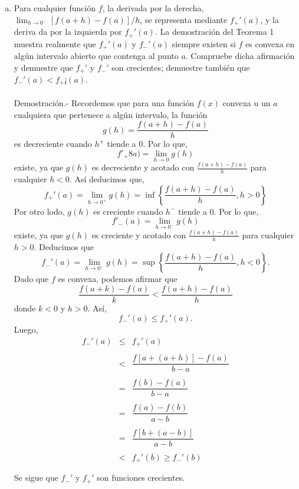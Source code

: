 \begin{enumerate}[\bfseries 1.]
\begin{enumerate}[(a)]
	    \item Para cualquier función $f$, la derivada por la derecha, $\displaystyle\lim_{h\to 0^-}[f(a+h)-f(a)]/h$, se representa mediante $f_+'(a)$, y la deriva­ da por la izquierda por $f_+'(a)$. La demostración del Teorema 1 muestra realmente que $f_+'(a)$ y $f_-' (a)$ siempre existen si $f$ es convexa en algún intervalo abierto que contenga al punto $a$. Compruebe dicha afirmación y demuestre que $f_+'$ y $f_-'$ son crecientes; demuestre también que $f_-'(a)<f_+¡(a)$.\\\\
		Demostración.-\; Recordemos que para una función $f(x)$ convexa u un $a$ cualquiera que pertenece a algún intervalo, la función
		$$g(h)=\dfrac{f(a+h)-f(a)}{h}$$
		es decreciente cuando $h^+$ tiende a $0$. Por lo que,
		$$f'_+8a)=\lim_{h\to 0}g(h)$$
		existe, ya que $g(h)$ es decreciente y acotado con $\frac{f(a+h)-f(a)}{h}$ para cualquier $h<0$. Así deducimos que, 
		$$f_+'(a)=\lim_{h\to 0^+}g(h)=\inf\left\{\dfrac{f(a+h)-f(a)}{h},h>0\right\}$$
		Por otro lodo, $g(h)$ es creciente cuando $h^-$ tiende a $0$. Por lo que,
		$$f'_-(a)=\lim_{h\to 0^-}g(h)$$
		existe, ya que $g(h)$ es creciente y acotado con $\frac{f(a+h)-f(a)}{h}$ para cualquier $h>0$. Deducimos que
		$$f_-'(a)=\lim_{h\to 0^-}g(h)=\sup\left\{\dfrac{f(a+h)-f(a)}{h},h<0\right\}.$$
		Dado que $f$ es convexa, podemos afirmar que 
		$$\dfrac{f(a+k)-f(a)}{k}<\dfrac{f(a+h)-f(a)}{h}$$
		donde $k<0$ y $h>0$. Así, 
		$$f_-'(a)\leq f_+'(a).$$
		Luego,
		$$
		\begin{array}{rcl}
		    f_-'(a) &\leq& f_+'(a)\\\\
			    &<& \dfrac{f[a+(a+h)]-f(a)}{b-a}\\\\
			    &=& \dfrac{f(b)-f(a)}{b-a}\\\\
			    &=& \dfrac{f(a)-f(b)}{a-b}\\\\
			    &=& \dfrac{f\left[b+(a-b)\right]}{a-b}\\\\
			    &<& f_+'(b)\geq f_-'(b)\\\\
		\end{array}
		$$
		Se sigue que $f_-'$ y $f_+'$ son funciones crecientes.\\\\


\end{enumerate}
\end{enumerate}
